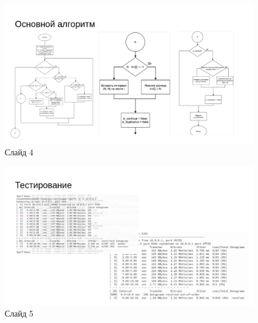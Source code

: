 \documentclass[14pt, a4paper]{extarticle}
\begin{document}
\begin{figure}[H]
	\centering
	\includegraphics[scale=0.4]{pr4.png}
		\caption{Слайд 4}
\end{figure}
\begin{figure}[H]
	\centering
	\includegraphics[scale=0.4]{pr5.png}
		\caption{Слайд 5}
\end{figure}
\end{document}
